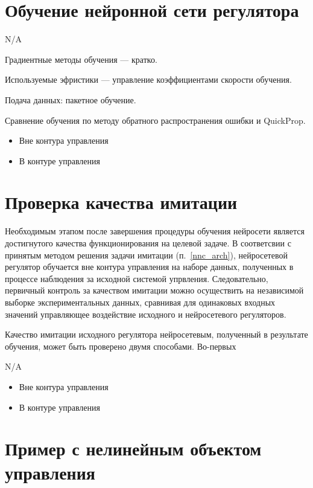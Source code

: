 \section{Обучение нейронной сети регулятора}

{\LARGE N/A}

Градиентные методы обучения --- кратко.

Используемые эфристики --- управление коэффициентами скорости обучения.

Подача данных: пакетное обучение.

Сравнение обучения по методу обратного распространения ошибки и QuickProp.

\begin{itemize}
\item Вне контура управления
\item В контуре управления
\end{itemize}

\section{Проверка качества имитации}

Необходимым этапом после завершения процедуры обучения нейросети
является достигнутого качества функционирования на целевой задаче.  В
соответсвии с принятым методом решения задачи имитации
(п.~\ref{nnc_arch}), нейросетевой регулятор обучается вне контура
управления на наборе данных, полученных в процессе наблюдения за
исходной системой упрвления.  Следовательно, первичный контроль за
качеством имитации можно осуществить на независимой выборке
экспериментальных данных, сравнивая для одинаковых входных значений
управляющее воздействие исходного и нейросетевого регуляторов.

Качество имитации исходного регулятора нейросетевым, полученный в
результате обучения, может быть проверено двумя способами.  Во-первых 

{\LARGE N/A}

\begin{itemize}
\item Вне контура управления
\item В контуре управления
\end{itemize}

\section{Пример с нелинейным объектом управления}

